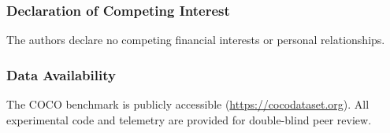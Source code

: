 \documentclass[preprint,12pt]{elsarticle}
\begin{document}
\subsubsection*{Declaration of Competing Interest}
The authors declare no competing financial interests or personal relationships.

\subsubsection*{Data Availability}
The COCO benchmark is publicly accessible (\url{https://cocodataset.org}). All experimental code and telemetry are provided for double-blind peer review.



\end{document}
